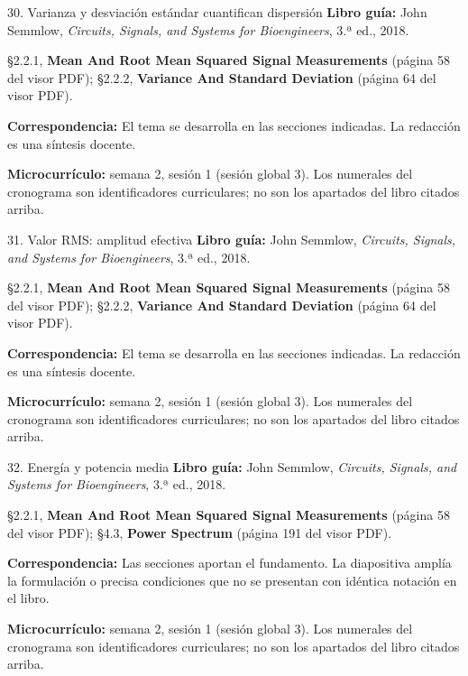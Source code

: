 \documentclass[
  10pt,
  ignorenonframetext,
  aspectratio=169,
  spanish,
]{beamer}
\begin{document}
\begin{frame}{30. Varianza y desviación estándar cuantifican dispersión}
\label{varianza-y-desviaciuxf3n-estuxe1ndar-cuantifican-dispersiuxf3n}
\textbf{Libro guía:} John Semmlow, \emph{Circuits, Signals, and Systems
for Bioengineers}, 3.ª ed., 2018.

§2.2.1, \textbf{Mean And Root Mean Squared Signal Measurements} (página
58 del visor PDF); §2.2.2, \textbf{Variance And Standard Deviation}
(página 64 del visor PDF).

\textbf{Correspondencia:} El tema se desarrolla en las secciones
indicadas. La redacción es una síntesis docente.

\textbf{Microcurrículo:} semana 2, sesión 1 (sesión global 3). Los
numerales del cronograma son identificadores curriculares; no son los
apartados del libro citados arriba.
\end{frame}

\begin{frame}{31. Valor RMS: amplitud efectiva}
\label{valor-rms-amplitud-efectiva}
\textbf{Libro guía:} John Semmlow, \emph{Circuits, Signals, and Systems
for Bioengineers}, 3.ª ed., 2018.

§2.2.1, \textbf{Mean And Root Mean Squared Signal Measurements} (página
58 del visor PDF); §2.2.2, \textbf{Variance And Standard Deviation}
(página 64 del visor PDF).

\textbf{Correspondencia:} El tema se desarrolla en las secciones
indicadas. La redacción es una síntesis docente.

\textbf{Microcurrículo:} semana 2, sesión 1 (sesión global 3). Los
numerales del cronograma son identificadores curriculares; no son los
apartados del libro citados arriba.
\end{frame}

\begin{frame}{32. Energía y potencia media}
\label{energuxeda-y-potencia-media}
\textbf{Libro guía:} John Semmlow, \emph{Circuits, Signals, and Systems
for Bioengineers}, 3.ª ed., 2018.

§2.2.1, \textbf{Mean And Root Mean Squared Signal Measurements} (página
58 del visor PDF); §4.3, \textbf{Power Spectrum} (página 191 del visor
PDF).

\textbf{Correspondencia:} Las secciones aportan el fundamento. La
diapositiva amplía la formulación o precisa condiciones que no se
presentan con idéntica notación en el libro.

\textbf{Microcurrículo:} semana 2, sesión 1 (sesión global 3). Los
numerales del cronograma son identificadores curriculares; no son los
apartados del libro citados arriba.
\end{frame}
\end{document}
